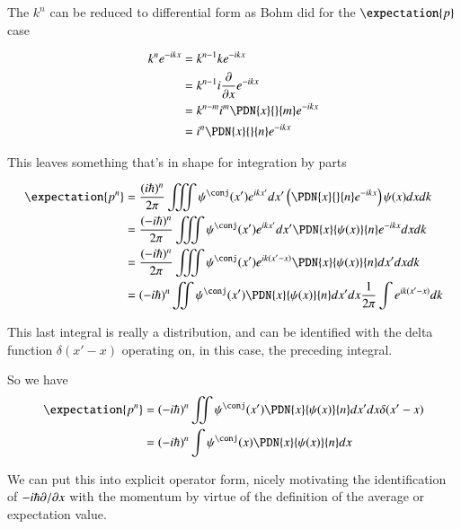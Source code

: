 The $k^n$ can be reduced to differential form as Bohm did for the $\expectation{p}$ case

\begin{align*}
k^n e^{-i k x} 
&= k^{n-1} k e^{-i k x} \\
&= k^{n-1} i \PD{x}{}e^{-i k x} \\
&= k^{n-m} i^m \PDN{x}{}{m}e^{-i k x} \\
&= i^n \PDN{x}{}{n}e^{-i k x} \\
\end{align*}

This leaves something that's in shape for integration by parts

\begin{align*}
\expectation{p^n} 
&= \frac{(i\hbar)^n}{2\pi} \iiint \psi^\conj(x') e^{ikx'} dx' \left( \PDN{x}{}{n}e^{-i k x} \right) \psi(x) dx dk \\
&= \frac{(-i\hbar)^n}{2\pi} \iiint \psi^\conj(x') e^{ikx'} dx' \PDN{x}{\psi(x)}{n} e^{-i k x} dx dk \\
&= \frac{(-i\hbar)^n}{2\pi} \iiint \psi^\conj(x') e^{ik(x'-x)} \PDN{x}{\psi(x)}{n} dx' dx dk \\
&= {(-i\hbar)^n}{} \iint \psi^\conj(x') \PDN{x}{\psi(x)}{n} dx' dx \inv{2\pi}\int e^{ik(x'-x)} dk \\
\end{align*}

This last integral is really a distribution, and can be identified with the delta function $\delta(x'-x)$ operating on, in this case, the preceding integral.
%


So we have
\begin{align*}
\expectation{p^n} 
&= {(-i\hbar)^n}{} \iint \psi^\conj(x') \PDN{x}{\psi(x)}{n} dx' dx \delta(x'-x) \\
&= {(-i\hbar)^n}{} \int \psi^\conj(x) \PDN{x}{\psi(x)}{n} dx \\
\end{align*}

We can put this into explicit operator form, nicely motivating the identification of $-i\hbar {\partial {}}/{\partial {x}}$ with the momentum by virtue 
of the definition of the average or expectation value.


